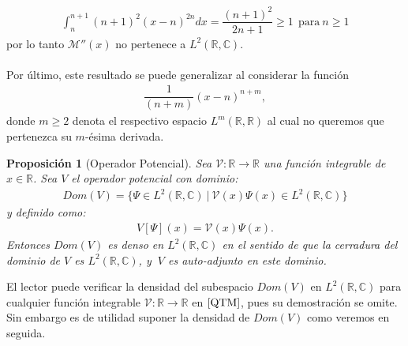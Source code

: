 \documentclass[12pt]{article}
\newtheorem{prop}[teo]{Proposición}
\theoremstyle{definition}
\newcommand*{\field}[1]{\mathbb{#1}}
\begin{document}
\begin{align*}
    \int_{n}^{n+1}(n+1)^2(x-n)^{2n}dx = \dfrac{(n+1)^2}{2n+1} \geq 1\:\: \text{para}\: n\geq 1
\end{align*}
por lo tanto $\mathcal{M}''(x)$ no pertenece a $L^2(\field{R},\field{C})$.
\\ \\
Por último, este resultado se puede  generalizar al considerar la función 
\begin{align*}
    \dfrac{1}{(n+m)}(x-n)^{n+m},
\end{align*}
donde $m\geq 2$ denota el respectivo espacio $L^m(\field{R},\field{R})$ al cual no queremos que pertenezca su $m$-ésima derivada. 
\begin{prop}[Operador Potencial]
    Sea $\mathcal{V}:\field{R}\rightarrow\field{R}$ una función integrable de $x\in\field{R}$. Sea $V$ el operador potencial con dominio:
    \begin{align*}  Dom(V) = \{
        \Psi\in L^{2}(\field{R},\field{C})\:|\:\mathcal{V}(x)\Psi(x)\in L^{2}(\field{R},\field{C})
        \}
    \end{align*}
    y definido como:
    \begin{align*}
        V[\Psi](x) = \mathcal{V}(x)\Psi(x).
    \end{align*}
    Entonces $Dom(V)$ es denso en $L^{2}(\field{R},\field{C})$ en el sentido de que la cerradura del dominio de $V$ es $L^{2}(\field{R},\field{C})$, y $\:V$ es auto-adjunto en este dominio.
    \label{prop:DomPot}
\end{prop}
\noindent
El lector puede verificar la densidad del subespacio $Dom(V)$ en $L^{2}(\field{R},\field{C})$ para cualquier función integrable $\mathcal{V}:\field{R}\longrightarrow\field{R}$ en $\cite[\text{Proposición 9.30,}\: \text{p.185}]{QTM}$, pues su demostración se omite. Sin embargo es de utilidad suponer la densidad de $Dom(V)$ como veremos en seguida.
\end{document}
